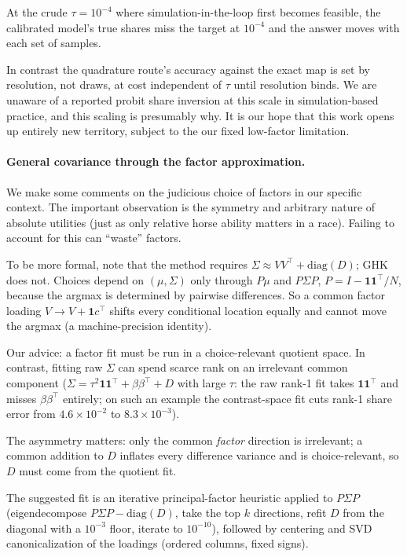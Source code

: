 \documentclass[12pt]{article}
\theoremstyle{remark}
\begin{document}
At the crude $\tau = 10^{-4}$ where simulation-in-the-loop first becomes feasible, the calibrated model's true
shares miss the target at $10^{-4}$ and the answer moves with each set of samples. 

In contrast the quadrature route's accuracy against the exact map is set by
resolution, not draws, at cost independent of $\tau$ until resolution
binds. We are unaware of a reported
probit share inversion at this scale in simulation-based practice, and this
scaling is presumably why. It is our hope that this work opens up entirely new
territory, subject to the our fixed low-factor limitation. 



\paragraph{General covariance through the factor approximation.} 

We make some comments on the judicious choice of factors in our specific context. The important 
observation is the symmetry and arbitrary nature of absolute utilities (just as only relative horse
ability matters in a race). Failing to account for this can ``waste'' factors. 

To be more formal, note that the method
requires $\Sigma \approx VV^\top + \mathrm{diag}(D)$; GHK does not. Choices depend on
$(\mu, \Sigma)$ only through $P\mu$ and $P\Sigma P$, $P = I -
\mathbf{1}\mathbf{1}^\top/N$, because the argmax is determined by
pairwise differences. So a common factor loading $V \to V +
\mathbf{1}c^\top$ shifts every conditional location equally and cannot move
the argmax (a machine-precision identity). 

Our advice: a factor fit must be run in a choice-relevant quotient space. In contrast, fitting raw $\Sigma$ can spend
scarce rank on an irrelevant common component ($\Sigma = \tau^2
\mathbf{1}\mathbf{1}^\top + \beta\beta^\top + D$ with large $\tau$: the
raw rank-1 fit takes $\mathbf{1}\mathbf{1}^\top$ and misses
$\beta\beta^\top$ entirely; on such an example the contrast-space fit cuts
rank-1 share error from $4.6\times10^{-2}$ to $8.3\times10^{-3}$).

The asymmetry matters: only the common \emph{factor} direction is irrelevant; a
common addition to $D$ inflates every difference variance and is
choice-relevant, so $D$ must come from the quotient fit.

The suggested fit is an iterative principal-factor heuristic applied to $P\Sigma P$ (eigendecompose
$P\Sigma P - \mathrm{diag}(D)$, take the top $k$ directions, refit $D$ from
the diagonal with a $10^{-3}$ floor, iterate to $10^{-10}$), followed by
centering and SVD canonicalization of the loadings (ordered columns, fixed
signs).
\end{document}
